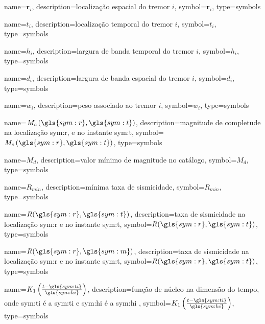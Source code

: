 {
	name={\ensuremath{\boldsymbol{r}_i}},
	description={localização espacial do tremor $i$},
	symbol={\ensuremath{\boldsymbol{r}_i}},
	type=symbols
}


{
	name={\ensuremath{t_i}},
	description={localização temporal do tremor $i$},
	symbol={\ensuremath{t_i}},
	type=symbols
}


{
	name={\ensuremath{h_i}},
	description={largura de banda temporal do tremor $i$},
	symbol={\ensuremath{h_i}},
	type=symbols
}


{
	name={\ensuremath{d_i}},
	description={largura de banda espacial do tremor $i$},
	symbol={\ensuremath{d_i}},
	type=symbols
}


{
	name={\ensuremath{ w_i }},
	description={peso associado ao tremor $i$},
	symbol={\ensuremath{ w_i }},
	type=symbols
}


{
	name={\ensuremath{ M_c\left( \gls{sym:r}, \gls{sym:t} \right)  }},
	description={magnitude de completude na localização \gls{sym:r}, e no instante \gls{sym:t}},
	symbol={\ensuremath{ M_c\left( \gls{sym:r}, \gls{sym:t} \right) }},
	type=symbols
}

{
	name={\ensuremath{M_d}},
	description={valor mínimo de magnitude no catálogo},
	symbol={\ensuremath{M_d}},
	type=symbols
}


{
	name={\ensuremath{R_{min}}},
	description={mínima taxa de sismicidade},
	symbol={\ensuremath{R_{min}}},
	type=symbols
}


{
	name={\ensuremath{R(\gls{sym:r},\gls{sym:t})}},
	description={taxa de sismicidade na localização \gls{sym:r} e no instante \gls{sym:t}},
	symbol={\ensuremath{R(\gls{sym:r},\gls{sym:t})}},
	type=symbols
}


{
	name={\ensuremath{R(\gls{sym:r},\gls{sym:m})}},
	description={taxa de sismicidade na localização \gls{sym:r} e no instante \gls{sym:t}},
	symbol={\ensuremath{R(\gls{sym:r},\gls{sym:t})}},
	type=symbols
}


{
	name={\ensuremath{K_1 \left( \frac{ t - \gls{sym:ti} }{ \gls{sym:hi} } \right) }},
	description={função de núcleo na dimensão do tempo, onde
					\gls{sym:ti} é a \glsdesc{sym:ti} e
					\gls{sym:hi} é a \glsdesc{sym:hi}
				},
	symbol={\ensuremath{K_1 \left( \frac{ t - \gls{sym:ti} }{ \gls{sym:hi} } \right)}},
	type=symbols
}

